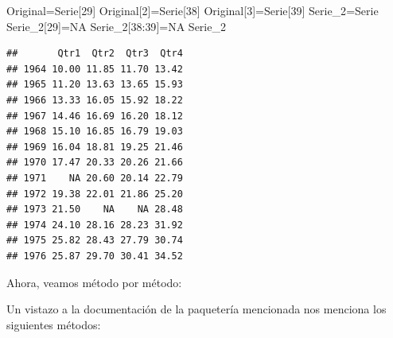 \documentclass[
]{article}
\newenvironment{Shaded}{\begin{snugshade}}{\end{snugshade}}
\newcommand{\ConstantTok}[1]{\textcolor[rgb]{0.00,0.00,0.00}{#1}}
\newcommand{\DecValTok}[1]{\textcolor[rgb]{0.00,0.00,0.81}{#1}}
\newcommand{\NormalTok}[1]{#1}
\newcommand{\OtherTok}[1]{\textcolor[rgb]{0.56,0.35,0.01}{#1}}
\newcommand{\SpecialCharTok}[1]{\textcolor[rgb]{0.00,0.00,0.00}{#1}}
\begin{document}
\begin{Shaded}
\begin{Highlighting}[]
\NormalTok{Original}\OtherTok{=}\NormalTok{Serie[}\DecValTok{29}\NormalTok{]}
\NormalTok{Original[}\DecValTok{2}\NormalTok{]}\OtherTok{=}\NormalTok{Serie[}\DecValTok{38}\NormalTok{]}
\NormalTok{Original[}\DecValTok{3}\NormalTok{]}\OtherTok{=}\NormalTok{Serie[}\DecValTok{39}\NormalTok{]}
\NormalTok{Serie\_2}\OtherTok{=}\NormalTok{Serie}
\NormalTok{Serie\_2[}\DecValTok{29}\NormalTok{]}\OtherTok{=}\ConstantTok{NA}
\NormalTok{Serie\_2[}\DecValTok{38}\SpecialCharTok{:}\DecValTok{39}\NormalTok{]}\OtherTok{=}\ConstantTok{NA}
\NormalTok{Serie\_2}
\end{Highlighting}
\end{Shaded}

\begin{verbatim}
##       Qtr1  Qtr2  Qtr3  Qtr4
## 1964 10.00 11.85 11.70 13.42
## 1965 11.20 13.63 13.65 15.93
## 1966 13.33 16.05 15.92 18.22
## 1967 14.46 16.69 16.20 18.12
## 1968 15.10 16.85 16.79 19.03
## 1969 16.04 18.81 19.25 21.46
## 1970 17.47 20.33 20.26 21.66
## 1971    NA 20.60 20.14 22.79
## 1972 19.38 22.01 21.86 25.20
## 1973 21.50    NA    NA 28.48
## 1974 24.10 28.16 28.23 31.92
## 1975 25.82 28.43 27.79 30.74
## 1976 25.87 29.70 30.41 34.52
\end{verbatim}

Ahora, veamos método por método:

Un vistazo a la documentación de la paquetería mencionada nos menciona
los siguientes métodos:
\end{document}
